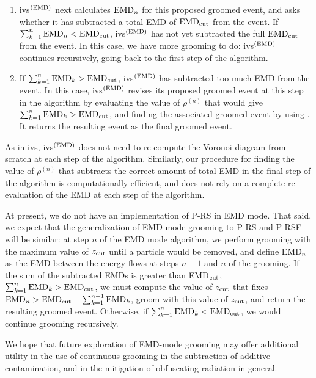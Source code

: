 \begin{subappendices}
\begin{enumerate}
    \item
    \gls{ivs}\(^{(\rm EMD)}\) next calculates \({\rm EMD}_n\) for this proposed groomed event, and asks whether it has subtracted a total EMD of \( {\rm EMD}_{\rm cut}\) from the event.
    If \(\sum_{k = 1}^n {\rm EMD}_n < {\rm EMD}_{\rm cut}\), \gls{ivs}\(^{(\rm EMD)}\) has not yet subtracted the full \({\rm EMD}_{\rm cut}\) from the event.
    In this case, we have more grooming to do:
    \gls{ivs}\(^{(\rm EMD)}\) continues recursively, going back to the first step of the algorithm.

    \item
    If \(\sum_{k = 1}^n {\rm EMD}_k > {\rm EMD}_{\rm cut}\), \gls{ivs}\(^{(\rm EMD)}\) has subtracted too much EMD from the event.
    In this case, \gls{ivs}\(^{(\rm EMD)}\) revises its proposed groomed event at this step in the algorithm by evaluating the value of \(\rho^{(n)}\) that would give \(\sum_{k = 1}^n {\rm EMD}_k > {\rm EMD}_{\rm cut}\), and finding the associated groomed event by using .
    It returns the resulting event as the final groomed event.
\end{enumerate}
As in \gls{ivs}, \gls{ivs}\(^{(\rm EMD)}\) does not need to re-compute the Voronoi diagram from scratch at each step of the algorithm.
%
Similarly, our procedure for finding the value of \(\rho^{(n)}\) that subtracts the correct amount of total EMD in the final step of the algorithm is computationally efficient, and does not rely on a complete re-evaluation of the EMD at each step of the algorithm.


At present, we do not have an implementation of P-RS in EMD mode.
%
That said, we expect that the generalization of EMD-mode grooming to P-RS and P-RSF will be similar:
%
at step \(n\) of the EMD mode algorithm, we perform grooming with the maximum value of \(z_{\rm cut}\) until a particle would be removed, and define EMD\(_n\) as the EMD between the energy flows at steps \(n-1\) and \(n\) of the grooming.
%
If the sum of the subtracted EMDs is greater than EMD\(_{\rm cut}\), \(\sum_{k = 1}^n {\rm EMD}_k > {\rm EMD}_{\rm cut}\),
%
we must compute the value of \(z_{\rm cut}\) that fixes \({\rm EMD}_n > {\rm EMD}_{\rm cut} - \sum_{k = 1}^{n-1} {\rm EMD}_k \), groom with this value of \(z_{\rm cut}\), and return the resulting groomed event.
%
Otherwise, if \(\sum_{k = 1}^n {\rm EMD}_k < {\rm EMD}_{\rm cut}\), we would continue grooming recursively.

We hope that future exploration of EMD-mode grooming may offer additional utility in the use of continuous grooming in the subtraction of \gls{additive-contamination}, and in the mitigation of obfuscating radiation in general.


\end{subappendices}
